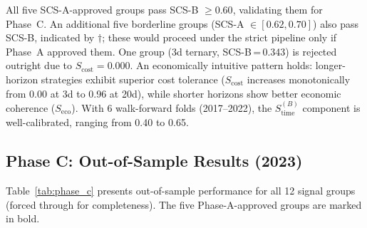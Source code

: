 \documentclass[12pt,a4paper]{article}
\begin{document}
All five SCS-A-approved groups pass SCS-B $\geq 0.60$, validating them for Phase~C. An additional five borderline groups (SCS-A $\in [0.62, 0.70]$) also pass SCS-B, indicated by $\dagger$; these would proceed under the strict pipeline only if Phase~A approved them. One group (3d ternary, SCS-B\,=\,0.343) is rejected outright due to $S_{\text{cost}}=0.000$. An economically intuitive pattern holds: longer-horizon strategies exhibit superior cost tolerance ($S_{\text{cost}}$ increases monotonically from 0.00 at 3d to 0.96 at 20d), while shorter horizons show better economic coherence ($S_{\text{eco}}$). With 6 walk-forward folds (2017--2022), the $S_{\text{time}}^{(B)}$ component is well-calibrated, ranging from 0.40 to 0.65.

\subsection{Phase C: Out-of-Sample Results (2023)}

Table~\ref{tab:phase_c} presents out-of-sample performance for all 12 signal groups (forced through for completeness). The five Phase-A-approved groups are marked in bold.
\end{document}
